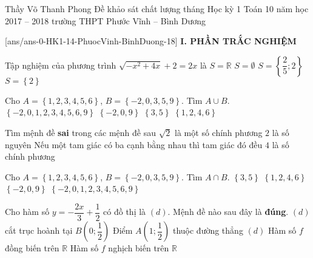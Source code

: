 
	\begin{name}
		{Thầy Võ Thanh Phong}
		{Đề khảo sát chất lượng tháng  Học kỳ 1 Toán 10 năm học 2017 – 2018 trường THPT Phước Vĩnh – Bình Dương}
	\end{name}
	\setcounter{ex}{0}\setcounter{bt}{0}
	[ans/ans-0-HK1-14-PhuocVinh-BinhDuong-18]
\noindent\textbf{I. PHẦN TRẮC NGHIỆM}
\begin{ex}%
	Tập nghiệm của phương trình $\sqrt{-x^2+4x}+2=2x$ là
	\choice
	{$S=\mathbb{R}$}
	{$S=\emptyset$}
	{$S=\left\{\dfrac{2}{5};2\right\}$}
	{\True $S=\left\{2\right\}$}
\end{ex}


\begin{ex}%
	Cho $A=\left\{1,2,3,4,5,6\right\}$,  $B=\left\{-2,0,3,5,9\right\}.$ Tìm $A\cup B$.
	\choice
	{\True $\left\{-2,0,1,2,3,4,5,6,9\right\}$}
	{$\left \{-2,0,9\right\}$}
	{$ \left\{3,5\right\}$}
	{$ \left\{1,2,4,6\right\}$}
\end{ex}

\begin{ex}%
	Tìm  mệnh đề \textbf{sai} trong các mệnh đề sau
	\choice
	{\True $\sqrt{2}$ là một số chính phương}
	{$2$ là số nguyên}
	{Nếu một tam giác có ba cạnh bằng nhau thì tam giác đó đều}
	{$4$ là số chính phương}
\end{ex}

\begin{ex}%
	Cho $A=\left\{1,2,3,4,5,6\right\}$, $B=\left\{-2,0,3,5,9\right\}.$ Tìm  $A\cap B.$
	\choice
	{\True $ \left\{3,5\right\}$}
	{$ \left\{1,2,4,6\right\}$}
	{$ \left\{-2,0,9\right\}$}
	{ $\left\{-2,0,1,2,3,4,5,6,9\right\}$}
\end{ex}

\begin{ex}%
	Cho hàm số $y=-\dfrac{2x}{3}+\dfrac{1}{2}$ có đồ thị là $(d).$ Mệnh đề nào sau đây là \textbf{đúng}.
	\choice
	{ $(d)$ cắt trục hoành tại $B\left(0;\dfrac{1}{2}\right)$}
	{Điểm $A\left(1;\dfrac{1}{2}\right)$ thuộc đường thẳng $(d)$}
	{Hàm số $f$ đồng biến trên $\mathbb{R}$}
	{\True Hàm số $f$ nghịch biến trên $\mathbb{R}$}
\end{ex}


